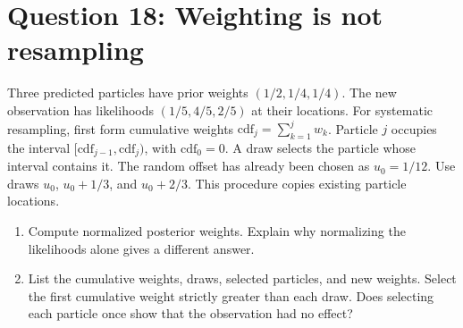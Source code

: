 \documentclass[11pt]{article}
\newenvironment{studentanswer}[1]
  {\par\medskip\noindent
   \begin{tcolorbox}[height from=#1 to 100cm, colback=white, colframe=gray!60,
     boxrule=0.6pt, arc=0pt, outer arc=0pt, left=7pt, right=7pt,
     top=7pt, bottom=7pt, title={Answer / work}, fonttitle=\small,
     coltitle=black, colbacktitle=gray!8, titlerule=0pt]
   \ignorespaces}
  {\end{tcolorbox}\par}
\begin{document}
\section*{Question 18: Weighting is not resampling}
Three predicted particles have prior weights $(1/2,1/4,1/4)$.
The new observation has likelihoods $(1/5,4/5,2/5)$ at their locations.
For systematic resampling, first form cumulative weights
$\mathrm{cdf}_j=\sum_{k=1}^j w_k$. Particle $j$ occupies the interval
$[\mathrm{cdf}_{j-1},\mathrm{cdf}_j)$, with $\mathrm{cdf}_0=0$.
A draw selects the particle whose interval contains it. The random offset
has already been chosen as $u_0=1/12$. Use draws $u_0$, $u_0+1/3$,
and $u_0+2/3$. This procedure copies existing particle locations.
\begin{enumerate}[label=(\alph*)]
\item \begin{minipage}[t]{\linewidth} Compute normalized posterior weights. Explain why normalizing
the likelihoods alone gives a different answer.

\begin{studentanswer}{4cm}
\end{studentanswer}

\end{minipage}

\item \begin{minipage}[t]{\linewidth} List the cumulative weights, draws, selected particles, and new
weights. Select the first cumulative weight strictly greater than each draw.
Does selecting each particle once show that the observation had no effect?

\begin{studentanswer}{4.5cm}
\end{studentanswer}

\end{minipage}

\end{enumerate}

\clearpage
\end{document}
